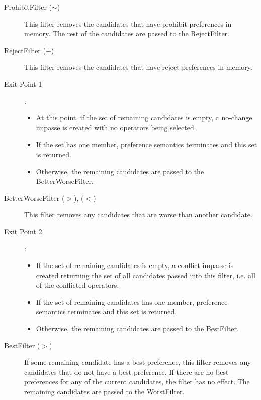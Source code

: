 \begin{description}
	
	\item[ProhibitFilter ($\sim$) ] This filter removes the candidates that
	have prohibit preferences in memory. The rest of the candidates are passed to
	the RejectFilter.
	
	\item[RejectFilter ($-$) ] This filter removes the candidates that have
	reject preferences in memory. 
	
	\item[Exit Point 1]:
	\begin{itemize}
		\item At this point, if the set of remaining candidates is empty, a no-change impasse
		is created with no operators being selected.
		\item If the set has one member, preference semantics terminates and this set is returned.
		\item Otherwise, the remaining candidates are passed to the
		BetterWorseFilter.
	\end{itemize}
	\index{-}
	
	\item[BetterWorseFilter ($>$), ($<$) ] This filter removes any candidates that are worse
	than another candidate.
	
	\item[Exit Point 2]:
	\begin{itemize}
		\item If the set of remaining candidates is empty, a conflict impasse is created
		returning the set of all candidates passed into this filter, i.e. all of the
		conflicted operators.
		\item If the set of remaining candidates has one
		member, preference semantics terminates and this set is returned.
		\item Otherwise, the remaining candidates are passed to the
		BestFilter.
	\end{itemize}
	\index{-}
	
	\item[BestFilter ($>$) ] If some remaining candidate has a best preference,
	this filter removes any candidates that do not have
	a best preference. If there are no best preferences for any of the current
	candidates, the filter has no effect. The remaining candidates are passed
	to the WorstFilter.
	

\end{description}
